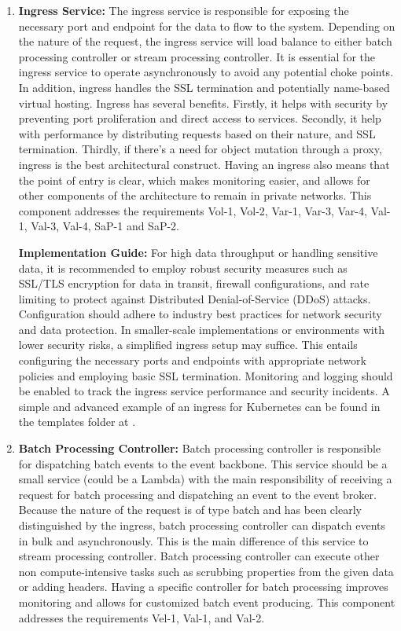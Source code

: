\documentclass[review]{elsarticle}
\begin{document}
\begin{enumerate}
    \item \textbf{Ingress Service:} The ingress service is responsible for exposing the necessary port and endpoint for the data to flow to the system. Depending on the nature of the request, the ingress service will load balance to either batch processing controller or stream processing controller. It is essential for the ingress service to operate asynchronously to avoid any potential choke points. In addition, ingress handles the SSL termination and potentially name-based virtual hosting. Ingress has several benefits. Firstly, it helps with security by preventing port proliferation and direct access to services. Secondly, it help with performance by distributing requests based on their nature, and SSL termination. Thirdly, if there's a need for object mutation through a proxy, ingress is the best architectural construct. Having an ingress also means that the point of entry is clear, which makes monitoring easier, and allows for other components of the architecture to remain in private networks. This component addresses the requirements Vol-1, Vol-2, Var-1, Var-3, Var-4, Val-1, Val-3, Val-4, SaP-1 and SaP-2.

    
    \textbf{Implementation Guide:} For high data throughput or handling sensitive data, it is recommended to employ robust security measures such as SSL/TLS encryption for data in transit, firewall configurations, and rate limiting to protect against Distributed Denial-of-Service (DDoS) attacks. Configuration should adhere to industry best practices for network security and data protection. In smaller-scale implementations or environments with lower security risks, a simplified ingress setup may suffice. This entails configuring the necessary ports and endpoints with appropriate network policies and employing basic SSL termination. Monitoring and logging should be enabled to track the ingress service performance and security incidents. A simple and advanced example of an ingress for Kubernetes can be found in the templates folder at \cite{cybermycelium2023}.

    \item \textbf{Batch Processing Controller:} Batch processing controller is responsible for dispatching batch events to the event backbone. This service should be a small service (could be a Lambda) with the main responsibility of receiving a request for batch processing and dispatching an event to the event broker. Because the nature of the request is of type batch and has been clearly distinguished by the ingress, batch processing controller can dispatch events in bulk and asynchronously. This is the main difference of this service to stream processing controller. Batch processing controller can execute other non compute-intensive tasks such as scrubbing properties from the given data or adding headers. Having a specific controller for batch processing improves monitoring and allows for customized batch event producing. This component addresses the requirements Vel-1, Val-1, and Val-2.
    

\end{enumerate}
\end{document}
